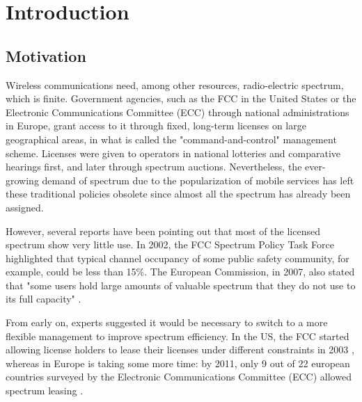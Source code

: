\graphicspath{ {img/SPEC_MAN/} }
\chapter{Introduction}
\section{Motivation}
Wireless communications need, among other resources, radio-electric spectrum, which is finite. 
Government agencies, such as the FCC in the United States or the Electronic Communications Committee (ECC) through national administrations in Europe, grant access to it through fixed, long-term licenses on large geographical areas, in what is called the "command-and-control" management scheme. 
Licenses were given to operators in national lotteries and comparative hearings first, and later through spectrum auctions. %
Nevertheless, the ever-growing demand of spectrum due to the popularization of mobile services has left these traditional policies obsolete since almost all the spectrum has already been assigned. %

However, several reports have been pointing out that most of the licensed spectrum show very little use. In 2002, the FCC Spectrum Policy Task Force \cite{ref:FCC2002} highlighted that typical channel occupancy of some public safety community, for example, could be less than 15\%. The European Commission, in 2007, also stated that "some users hold large amounts of valuable spectrum that they do not use to its full capacity" \cite{ref:Commission2007}.

From early on, experts suggested \cite{ref:Valletti2001} it would be necessary to switch to a more flexible management to improve spectrum efficiency. In the US, the FCC started allowing license holders to lease their licenses under different constraints in 2003 \cite{ref:Mayo2010}, whereas in Europe is taking some more time: by 2011, only 9 out of 22 european countries surveyed by the Electronic Communications Committee (ECC) allowed spectrum leasing \cite{ref:ECC2011}. %

